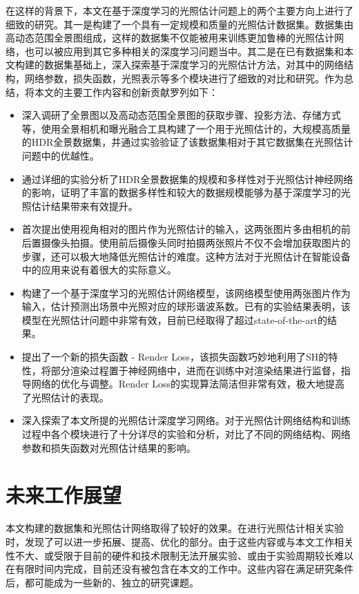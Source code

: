 在这样的背景下，本文在基于深度学习的光照估计问题上的两个主要方向上进行了细致的研究。其一是构建了一个具有一定规模和质量的光照估计数据集。数据集由高动态范围全景图组成，这样的数据集不仅能被用来训练更加鲁棒的光照估计网络，也可以被应用到其它多种相关的深度学习问题当中。其二是在已有数据集和本文构建的数据集基础上，深入探索基于深度学习的光照估计方法，对其中的网络结构，网络参数，损失函数，光照表示等多个模块进行了细致的对比和研究。作为总结，将本文的主要工作内容和创新贡献罗列如下：
\begin{itemize}
    \item 深入调研了全景图以及高动态范围全景图的获取步骤、投影方法、存储方式等，使用全景相机和曝光融合工具构建了一个用于光照估计的，大规模高质量的HDR全景数据集，并通过实验验证了该数据集相对于其它数据集在光照估计问题中的优越性。
    \item 通过详细的实验分析了HDR全景数据集的规模和多样性对于光照估计神经网络的影响，证明了丰富的数据多样性和较大的数据规模能够为基于深度学习的光照估计结果带来有效提升。
    \item 首次提出使用视角相对的图片作为光照估计的输入，这两张图片多由相机的前后置摄像头拍摄。使用前后摄像头同时拍摄两张照片不仅不会增加获取图片的步骤，还可以极大地降低光照估计的难度。这种方法对于光照估计在智能设备中的应用来说有着很大的实际意义。
    \item 构建了一个基于深度学习的光照估计网络模型，该网络模型使用两张图片作为输入，估计预测出场景中光照对应的球形谐波系数。已有的实验结果表明，该模型在光照估计问题中非常有效，目前已经取得了超过state-of-the-art的结果。
    \item 提出了一个新的损失函数 - Render Loss，该损失函数巧妙地利用了SH的特性，将部分渲染过程置于神经网络中，进而在训练中对渲染结果进行监督，指导网络的优化与调整。Render Loss的实现算法简洁但非常有效，极大地提高了光照估计的表现。
    \item 深入探索了本文所提的光照估计深度学习网络。对于光照估计网络结构和训练过程中各个模块进行了十分详尽的实验和分析，对比了不同的网络结构、网络参数和损失函数对光照估计结果的影响。
\end{itemize}

\section{未来工作展望}
本文构建的数据集和光照估计网络取得了较好的效果。在进行光照估计相关实验时，发现了可以进一步拓展、提高、优化的部分。由于这些内容或与本文工作相关性不大、或受限于目前的硬件和技术限制无法开展实验、或由于实验周期较长难以在有限时间内完成，目前还没有被包含在本文的工作中。这些内容在满足研究条件后，都可能成为一些新的、独立的研究课题。

